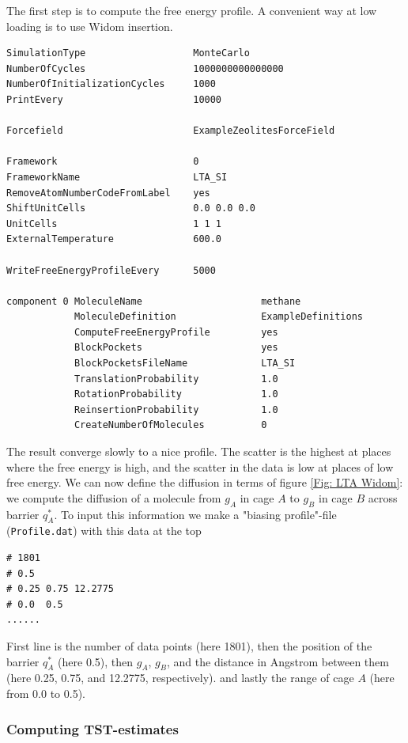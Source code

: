The first step is to compute the free energy profile.
A convenient way at low loading is to use Widom insertion.

\begin{tiny}
\begin{verbatim}
SimulationType                   MonteCarlo
NumberOfCycles                   1000000000000000
NumberOfInitializationCycles     1000
PrintEvery                       10000

Forcefield                       ExampleZeolitesForceField

Framework                        0
FrameworkName                    LTA_SI
RemoveAtomNumberCodeFromLabel    yes
ShiftUnitCells                   0.0 0.0 0.0
UnitCells                        1 1 1
ExternalTemperature              600.0

WriteFreeEnergyProfileEvery      5000

component 0 MoleculeName                     methane
            MoleculeDefinition               ExampleDefinitions
            ComputeFreeEnergyProfile         yes
            BlockPockets                     yes
            BlockPocketsFileName             LTA_SI
            TranslationProbability           1.0
            RotationProbability              1.0
            ReinsertionProbability           1.0
            CreateNumberOfMolecules          0
\end{verbatim}
\end{tiny}

The result converge slowly to a nice profile. The scatter is the highest at places where the free energy is high, and
the scatter in the data is low at places of low free energy. We can now define the diffusion in terms of
figure \ref{Fig: LTA Widom}: we compute the diffusion of a molecule from $g_A$ in cage $A$ to $g_B$ in cage $B$
across barrier $q_A^*$.
To input this information we make a "biasing profile"-file (\verb+Profile.dat+) with this data at the top
\begin{small}
\begin{verbatim}
# 1801
# 0.5
# 0.25 0.75 12.2775
# 0.0  0.5
......
\end{verbatim}
\end{small}
First line is the number of data points (here 1801), then the position of the barrier $q_A^*$ (here 0.5),
then $g_A$, $g_B$, and the distance in Angstrom between them (here 0.25, 0.75, and 12.2775, respectively).
and lastly the range of cage $A$ (here from 0.0 to 0.5).

\subsubsection{Computing TST-estimates}

